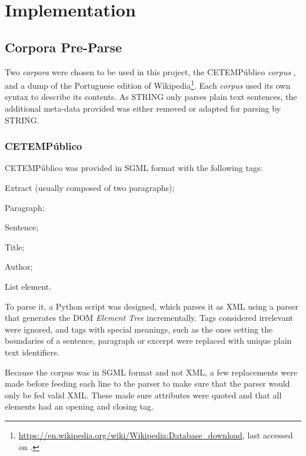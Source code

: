 \chapter{Implementation}
\label{ch:implementation}

\section{Corpora Pre-Parse}

Two \emph{corpora} were chosen to be used in this project, the CETEMPúblico 
\emph{corpus} \citep{rocha2000cetempublico}, and a dump of the Portuguese 
edition of 
Wikipedia\footnote{\url{https://en.wikipedia.org/wiki/Wikipedia:Database_download},
 last accessed on .}. Each \emph{corpus} used its own 
syntax to describe its contents. As \ac{STRING} only parses plain text 
sentences, the additional meta-data provided was either removed or adapted for 
parsing by \ac{STRING}.

\subsection{CETEMPúblico}

CETEMPúblico was provided in \ac{SGML} format with the following tags:

\begin{description}[labelwidth=3em]
 \item [\texttt{ext}] Extract (usually composed of two paragraphs);
 \item [\texttt{p}]   Paragraph;
 \item [\texttt{s}]   Sentence;
 \item [\texttt{t}]   Title;
 \item [\texttt{a}]   Author;
 \item [\texttt{li}]  List element.
\end{description}

To parse it, a Python script was designed, which parses it as \ac{XML} using a
parser that generates the \ac{DOM} \emph{Element Tree} incrementally. Tags
considered irrelevant were ignored, and tags with special meanings, such as the
ones setting the boundaries of a sentence, paragraph or excerpt were replaced
with unique plain text identifiers.

Because the corpus was in \ac{SGML} format and not \ac{XML}, a few replacements
were made before feeding each line to the parser to make sure that the parser 
would only be fed valid \ac{XML}. These made sure attributes were quoted and 
that all elements had an opening and closing tag.

